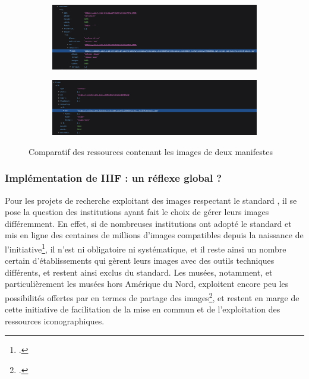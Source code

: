 	\begin{figure}[h]
		\begin{subfigure}{1\linewidth}
			\centering
			\includegraphics[width=15cm]{images/dresden_manifest.png}
		\end{subfigure}
		\hspace{1pt}
		\begin{subfigure}{1\linewidth}
			\centering
			\includegraphics[width=15cm]{images/yale_manifest.png}
		\end{subfigure}
		\hspace{1pt}
		\caption{Comparatif des ressources contenant les images de deux manifestes \iiif}
		\label{fig:manifests_canvas}
	\end{figure}

    \subsubsection{Implémentation de IIIF : un réflexe global ?}
	Pour les projets de recherche exploitant des images respectant le standard \iiif, il se pose la question des institutions ayant fait le choix de gérer leurs images différemment. En effet, si de nombreuses institutions ont adopté le standard et mis en ligne des centaines de millions d'images compatibles depuis la naissance de l'initiative\footcite{malloryIIIFMuseumsExplained2019}, il n'est ni obligatoire ni systématique, et il reste ainsi un nombre certain d'établissements qui gèrent leurs images avec des outils techniques différents, et restent ainsi exclus du standard. Les musées, notamment, et particulièrement les musées hors Amérique du Nord, exploitent encore peu les possibilités offertes par \iiif en termes de partage des images\footcite{IIIFMuseumsFrance2023}, et restent en marge de cette initiative de facilitation de la mise en commun et de l'exploitation des ressources iconographiques.
	
